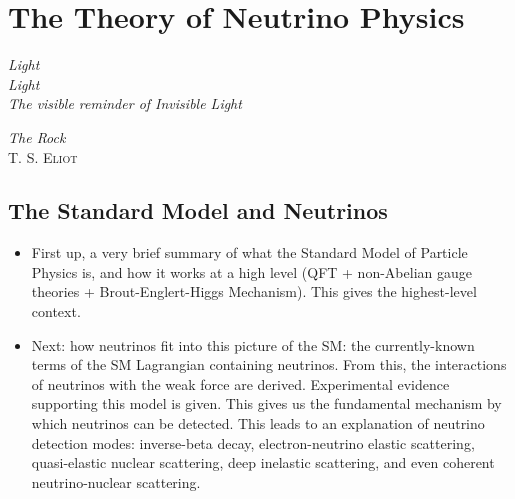 
\chapter{The Theory of Neutrino Physics}\label{chap:theory}
\setlength{\epigraphwidth}{.45\textwidth}
\epigraph{\textit{Light\\Light\\The visible reminder of Invisible Light}}{\textit{The Rock}\\\textsc{T. S. Eliot}}
\setlength{\epigraphwidth}{.4\textwidth}
\section{The Standard Model and Neutrinos}
\begin{itemize}
    \item First up, a very brief summary of what the Standard Model of Particle Physics is, and how it works at a high level (QFT + non-Abelian gauge theories + Brout-Englert-Higgs Mechanism). This gives the highest-level context.
    \item Next: how neutrinos fit into this picture of the SM: the currently-known terms of the SM Lagrangian containing neutrinos. From this, the interactions of neutrinos with the weak force are derived. Experimental evidence supporting this model is given. This gives us the fundamental mechanism by which neutrinos can be detected. This leads to an explanation of neutrino detection modes: inverse-beta decay, electron-neutrino elastic scattering, quasi-elastic nuclear scattering, deep inelastic scattering, and even coherent neutrino-nuclear scattering.
\end{itemize}
